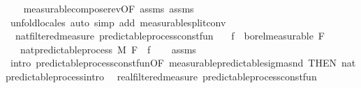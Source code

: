 \begin{isabellebody}
%
\isadelimproof
\ \ %
\endisadelimproof
%
\isatagproof
{}\isamarkupfalse%
\ measurable{\isacharunderscore}{\kern0pt}compose{\isacharunderscore}{\kern0pt}rev{\isacharbrackleft}{\kern0pt}OF\ assms{\isacharparenleft}{\kern0pt}{}{\isacharparenright}{\kern0pt}{\isacharbrackright}{\kern0pt}\ assms{\isacharparenleft}{\kern0pt}{}{\isacharparenright}{\kern0pt}\ \isamarkupfalse%
\ {\isacharparenleft}{\kern0pt}unfold{\isacharunderscore}{\kern0pt}locales{\isacharparenright}{\kern0pt}\ {\isacharparenleft}{\kern0pt}auto\ simp\ add{\isacharcolon}{\kern0pt}\ measurable{\isacharunderscore}{\kern0pt}split{\isacharunderscore}{\kern0pt}conv{\isacharparenright}{\kern0pt}%
\endisatagproof
{\isafoldproof}%
%
\isadelimproof
\isanewline
%
\endisadelimproof
\isanewline
{}\isamarkupfalse%
\ {\isacharparenleft}{\kern0pt}\ nat{\isacharunderscore}{\kern0pt}filtered{\isacharunderscore}{\kern0pt}measure{\isacharparenright}{\kern0pt}\ predictable{\isacharunderscore}{\kern0pt}process{\isacharunderscore}{\kern0pt}const{\isacharunderscore}{\kern0pt}fun{\isacharcolon}{\kern0pt}\isanewline
\ \ \ {\isachardoublequoteopen}f\ {\isasymin}\ borel{\isacharunderscore}{\kern0pt}measurable\ {\isacharparenleft}{\kern0pt}F\ {}{\isacharparenright}{\kern0pt}{\isachardoublequoteclose}\isanewline
\ \ \ {\isachardoublequoteopen}nat{\isacharunderscore}{\kern0pt}predictable{\isacharunderscore}{\kern0pt}process\ M\ F\ {\isacharparenleft}{\kern0pt}{\isasymlambda}{\isacharunderscore}{\kern0pt}{\isachardot}{\kern0pt}\ f{\isacharparenright}{\kern0pt}{\isachardoublequoteclose}\isanewline
%
\isadelimproof
\ \ %
\endisadelimproof
%
\isatagproof
{}\isamarkupfalse%
\ assms\ \isamarkupfalse%
\ {\isacharparenleft}{\kern0pt}intro\ predictable{\isacharunderscore}{\kern0pt}process{\isacharunderscore}{\kern0pt}const{\isacharunderscore}{\kern0pt}fun{\isacharbrackleft}{\kern0pt}OF\ measurable{\isacharunderscore}{\kern0pt}predictable{\isacharunderscore}{\kern0pt}sigma{\isacharunderscore}{\kern0pt}snd{\isacharcomma}{\kern0pt}\ THEN\ nat{\isacharunderscore}{\kern0pt}predictable{\isacharunderscore}{\kern0pt}process{\isachardot}{\kern0pt}intro{\isacharbrackright}{\kern0pt}{\isacharparenright}{\kern0pt}%
\endisatagproof
{\isafoldproof}%
%
\isadelimproof
\isanewline
%
\endisadelimproof
\isanewline
{}\isamarkupfalse%
\ {\isacharparenleft}{\kern0pt}\ real{\isacharunderscore}{\kern0pt}filtered{\isacharunderscore}{\kern0pt}measure{\isacharparenright}{\kern0pt}\ predictable{\isacharunderscore}{\kern0pt}process{\isacharunderscore}{\kern0pt}const{\isacharunderscore}{\kern0pt}fun{\isacharcolon}{\kern0pt}\isanewline

\end{isabellebody}
